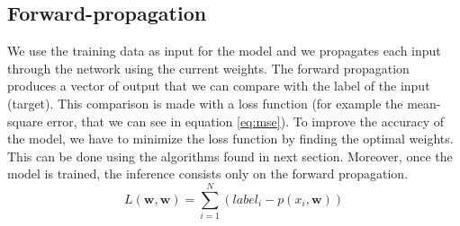 \subsection{Forward-propagation} \label{subs:trainforward}
We use the training data as input for the model and we propagates each input through the network using the current weights. The forward propagation produces a vector of output that we can compare with the label of the input (target). This comparison is made with a loss function (for example the mean-square error, that we can see in equation \eqref{eq:mse}). To improve the accuracy of the model, we have to minimize the loss function by finding the optimal weights. This can be done using the algorithms found in next section. Moreover, once the model is trained, the inference consists only on the forward propagation.
%
\begin{equation}
    L(\boldsymbol{w}, \boldsymbol{w}) = \sum^{N}_{i=1} (label_i - p(x_i, \boldsymbol{w}))
    \label{eq:mse}
\end{equation}
